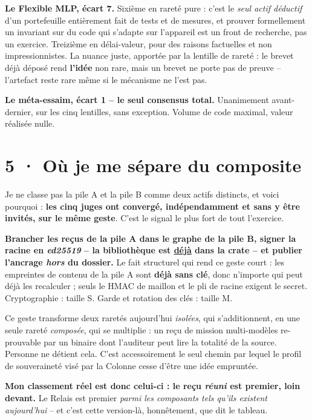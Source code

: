 \documentclass[10pt]{article}
\newcommand{\sz}[1]{{\small\color{grey}\textsf{#1}}}
\begin{document}
\textbf{Le Flexible MLP, écart 7.} Sixième en rareté pure : c'est le \emph{seul actif déductif} d'un
portefeuille entièrement fait de tests et de mesures, et prouver formellement un invariant sur du code
qui s'adapte sur l'appareil est un front de recherche, pas un exercice. Treizième en délai-valeur, pour
des raisons factuelles et non impressionnistes. La nuance juste, apportée par la lentille de rareté : le
brevet déjà déposé rend \textbf{l'idée} non rare, mais un brevet ne porte pas de preuve -- l'artefact
reste rare même si le mécanisme ne l'est pas.

\textbf{Le méta-essaim, écart 1 -- le seul consensus total.} Unanimement avant-dernier, sur les cinq
lentilles, sans exception. Volume de code maximal, valeur réalisée nulle.

\section{5 · Où je me sépare du composite}

Je ne classe pas la pile A et la pile B comme deux actifs distincts, et voici pourquoi : \textbf{les cinq
juges ont convergé, indépendamment et sans y être invités, sur le même geste}. C'est le signal le plus
fort de tout l'exercice.

\begin{cle}
\textbf{Brancher les reçus de la pile A dans le graphe de la pile B, signer la racine en \emph{ed25519}
-- la bibliothèque est \underline{déjà} dans la crate -- et publier l'ancrage \emph{hors} du dossier.}
Le fait structurel qui rend ce geste court : les empreintes de contenu de la pile A sont \textbf{déjà
sans clé}, donc n'importe qui peut déjà les recalculer ; seuls le HMAC de maillon et le pli de racine
exigent le secret. \sz{Cryptographie : taille S. Garde et rotation des clés : taille M.}
\end{cle}

Ce geste transforme deux raretés aujourd'hui \emph{isolées}, qui s'additionnent, en une seule rareté
\emph{composée}, qui se multiplie : un reçu de mission multi-modèles re-prouvable par un binaire dont
l'auditeur peut lire la totalité de la source. Personne ne détient cela. C'est accessoirement le seul
chemin par lequel le profil de souveraineté visé par la Colonne cesse d'être une idée empruntée.

\textbf{Mon classement réel est donc celui-ci : le reçu \emph{réuni} est premier, loin devant.} Le Relais
est premier \emph{parmi les composants tels qu'ils existent aujourd'hui} -- et c'est cette version-là,
honnêtement, que dit le tableau.
\end{document}

